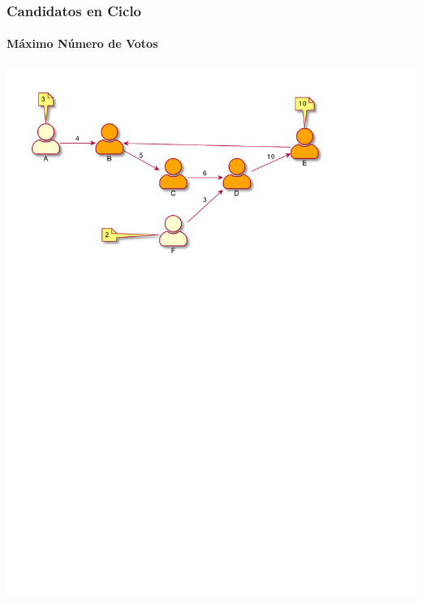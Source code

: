 \documentclass{beamer}
\begin{document}
\begin{frame}
    \frametitle{Candidatos en Ciclo}
    \framesubtitle{M\'aximo N\'umero de Votos}

    \begin{center}
        \includegraphics[scale=0.65]{graphics/max-votes-in-cycle.pdf}
    \end{center}

\end{frame}
\end{document}
